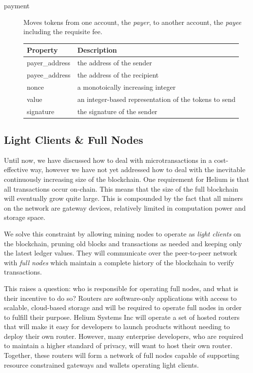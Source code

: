 \documentclass[10pt, nonatbib, nocopyrightspace, reprint]{sigplanconf}
\begin{document}
\begin{description}
\item [payment] \label{payment} Moves tokens from one account, the \emph{payer}, to another account, the \emph{payee} including the requisite fee.

\begin{table}[H]
  \centering
  \begin{tabularx}{\columnwidth}{l X}
      \toprule
      Property & Description \\ \midrule
      payer\_address & the address of the sender \\
      payee\_address & the address of the recipient \\
      nonce & a monotoically increasing integer \\
      value & an integer-based representation of the tokens to send \\
      signature & the signature of the sender
  \end{tabularx}
\end{table}

\end{description}

\subsection{Light Clients \& Full Nodes} \label{full-nodes}

Until now, we have discussed how to deal with microtransactions in a cost-effective way, however we have not yet addressed how to deal with the inevitable continuously increasing size of the blockchain. One requirement for Helium is that all transactions occur on-chain. This means that the size of the full blockchain will eventually grow quite large. This is compounded by the fact that all miners on the network are gateway devices, relatively limited in computation power and storage space.

We solve this constraint by allowing mining nodes to operate as \emph{light clients} on the blockchain, pruning old blocks and transactions as needed and keeping only the latest ledger values. They will communicate over the peer-to-peer network with \emph{full nodes} which maintain a complete history of the blockchain to verify transactions.

This raises a question: who is responsible for operating full nodes, and what is their incentive to do so? Routers are software-only applications with access to scalable, cloud-based storage and will be required to operate full nodes in order to fulfill their purpose. Helium Systems Inc will operate a set of hosted routers that will make it easy for developers to launch products without needing to deploy their own router. However, many enterprise developers, who are required to maintain a higher standard of privacy, will want to host their own router. Together, these routers will form a network of full nodes capable of supporting resource constrained gateways and wallets operating light clients.
\end{document}
